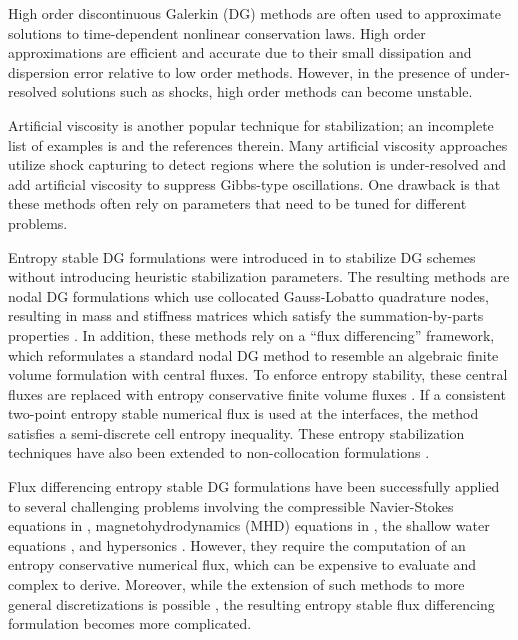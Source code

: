 \documentclass{elsarticle}
\theoremstyle{definition}
\theoremstyle{plain}
\theoremstyle{plain}
\begin{document}
High order discontinuous Galerkin (DG) methods are often used to approximate solutions to time-dependent nonlinear conservation laws. High order approximations are efficient and accurate due to their small dissipation and dispersion error relative to low order methods. However, in the presence of under-resolved solutions such as shocks, high order methods can become unstable. 

Artificial viscosity is another popular technique for stabilization; an incomplete list of examples is \cite{berthon2023artificial, glaubitz2019smooth, guermond2011entropy, hennemann2021provably, lv2016entropy, klockner2011viscous, majda1979numerical, persson2006sub, vonneumann1950method} and the references therein. Many artificial viscosity approaches utilize shock capturing to detect regions where the solution is under-resolved and add artificial viscosity to suppress Gibbs-type oscillations. One drawback is that these methods often rely on parameters that need to be tuned for different problems. 

Entropy stable DG formulations were introduced in \cite{carpenter2014entropy, chen2017entropy, gassner2016split} to stabilize DG schemes without introducing heuristic stabilization parameters. The resulting methods are nodal DG formulations which use collocated Gauss-Lobatto quadrature nodes, resulting in mass and stiffness matrices which satisfy the summation-by-parts properties \cite{gassner2013skew}. In addition, these methods rely on a ``flux differencing'' framework, which reformulates a standard nodal DG method to resemble an algebraic finite volume formulation with central fluxes. To enforce entropy stability, these central fluxes are replaced with entropy conservative finite volume fluxes \cite{chandrashekar2013kinetic,  ismail2009affordable, ranocha2018comparison, tadmor1987numerical}. %
If a consistent two-point entropy stable numerical flux is used at the interfaces, the method satisfies a semi-discrete cell entropy inequality. These entropy stabilization techniques have also been extended to non-collocation formulations \cite{chan2018discretely, CICCHINO2025}. 

Flux differencing entropy stable DG formulations have been successfully applied to several challenging problems involving the compressible Navier-Stokes equations in \cite{PARSANI2021}, magnetohydrodynamics (MHD) equations in \cite{BOHM2020, RUEDARAMIREZ2021}, the shallow water equations \cite{wintermeyer2017entropy, wintermeyer2018entropy}, and hypersonics \cite{OBLAPENKO2025, PEYVAN2023}. However, they require the computation of an entropy conservative numerical flux, which can be expensive to evaluate and complex to derive.
Moreover, while the extension of such methods to more general discretizations is possible \cite{chan2018discretely, CICCHINO2025, keim2025}, the resulting entropy stable flux differencing formulation becomes more complicated.
\end{document}
